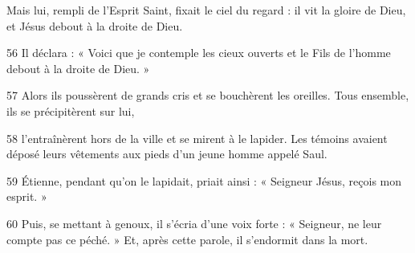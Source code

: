 Mais lui, rempli de l’Esprit Saint, fixait le ciel du regard : il vit la gloire de Dieu, et Jésus debout à la droite de Dieu.

56 Il déclara : « Voici que je contemple les cieux ouverts et le Fils de l’homme debout à la droite de Dieu. »

57 Alors ils poussèrent de grands cris et se bouchèrent les oreilles. Tous ensemble, ils se précipitèrent sur lui,

58 l’entraînèrent hors de la ville et se mirent à le lapider. Les témoins avaient déposé leurs vêtements aux pieds d’un jeune homme appelé Saul.

59 Étienne, pendant qu’on le lapidait, priait ainsi : « Seigneur Jésus, reçois mon esprit. »

60 Puis, se mettant à genoux, il s’écria d’une voix forte : « Seigneur, ne leur compte pas ce péché. » Et, après cette parole, il s’endormit dans la mort.

